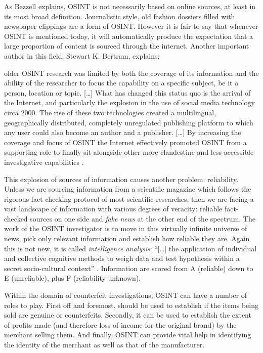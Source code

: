 As Bezzell explains, OSINT is not necessarily based on online sources, at least
in its most broad definition. Journalistic style, old fashion dossiers filled
with newspaper clippings are a form of OSINT. However it is fair to say that
whenever OSINT is mentioned today, it will automatically produce the expectation
that a large proportion of content is sourced through the internet. Another
important author in this field, Stewart K. Bertram, explains:
\begin{displayquote}
older OSINT research was limited by both the coverage of its information and the
ability of the researcher to focus the capability on a specific subject, be it
a person, location or topic. [\ldots] What has changed this status quo is the
arrival of the Internet, and particularly the explosion in the use of social
media technology circa 2000. The rise of these two technologies created a
multilingual, geographically distributed, completely unregulated publishing
platform to which any user could also become an author and a publisher. [\ldots]
By increasing the coverage and focus of OSINT the Internet effectively promoted
OSINT from a supporting role to finally sit alongside other more clandestine and
less accessible investigative capabilities \cite{SB15}.
\end{displayquote}

This explosion of sources of information causes another problem: reliability.
Unless we are sourcing information from a scientific magazine which
follows the rigorous fact checking protocol of most scientific researches, then
we are facing a vast landscape of information with various degrees of
veracity: reliable fact-checked sources on one side and \emph{fake news} at
the other end of the spectrum. The work of the OSINT investigator is to move in
this virtually infinite universe of news, pick only relevant information and
establish how reliable they are. Again this is not new, it is called
\emph{intelligence analysis}: ``[\ldots] the application of individual and
collective cognitive methods to weigh data and test hypothesis within a secret
socio-cultural context'' \cite{JH07}. Information
are scored from A (reliable) down to E (unreliable), plus F (reliability
unknown).

Within the domain of counterfeit investigations, OSINT can have a number of
roles to play. First off and foremost, should be used to establish if the items
being sold are genuine or counterfeits. Secondly, it can be used to establish
the extent of profits made (and therefore loss of income for the original brand)
by the merchant selling them. And finally, OSINT can provide vital help in
identifying the identity of the merchant as well as that of the manufacturer.


